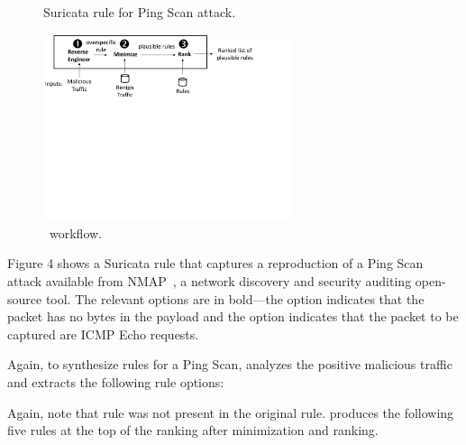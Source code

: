 \documentclass[sigconf,review, anonymous]{acmart}
\begin{document}
\begin{figure}[h!]
  \vspace{1ex}
  
  \caption{Suricata rule for Ping Scan attack.}
  \label{fig:pingscan-example}
  \vspace{1ex}  
\end{figure}

\begin{figure}[ht!]
  \centering
  \includegraphics[trim=0 350 100 0,clip,width=0.65\textwidth]{figs/nids-workflow}
  \caption{\tname\ workflow.}
  \label{fig:overview}
  \vspace{-1ex}
\end{figure}


Figure 4 shows a Suricata rule that captures a reproduction of a Ping
Scan attack available from NMAP~\cite{netmap}, a network discovery and
security auditing open-source tool. The relevant options are in
bold---the option  indicates that the packet has no
bytes in the payload and the option  indicates that
the packet to be captured are ICMP Echo requests.

Again, to synthesize rules for a Ping Scan, \tname{} analyzes the
positive malicious traffic and extracts the following rule options:

\begin{figure}[h]
  \vspace{-2ex}
  
  \vspace{-3ex}  
\end{figure}


Again, note that rule  was not present in the original
rule.  \tname{} produces the following five rules at the top of the
ranking after minimization and ranking.
\end{document}
